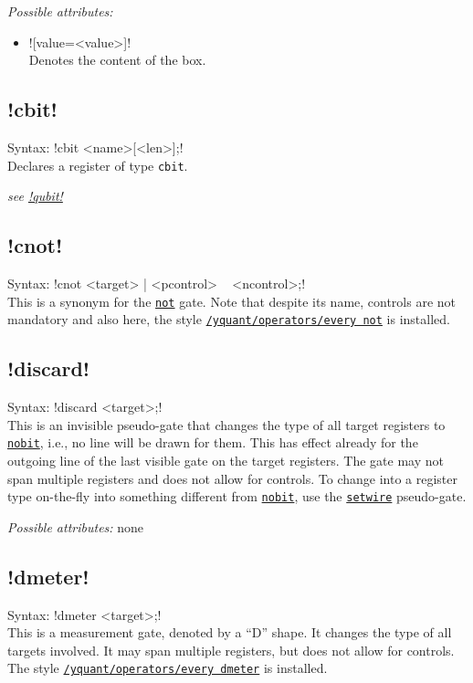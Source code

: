 \documentclass{scrartcl}
\def\gate#1{\hyperref[gate:#1]{\texttt{#1}}}
\def\style#1{\hyperref[style:#1]{\texttt{#1}}}
\begin{document}
         \emph{Possible attributes:}
         \begin{itemize}
            \item \yquant![value=<value>]! \\
               Denotes the content of the box.
         \end{itemize}
      
      \subsection{\texorpdfstring{\yquant!cbit!}{cbit}}\label{gate:cbit}
         Syntax: \yquant!cbit <name>[<len>];! \\
         Declares a register of type \texttt{cbit}.
         
         \emph{see \hyperref[gate:qubit]{\yquant!qubit!}}
      
      \subsection{\texorpdfstring{\yquant!cnot!}{cnot}}\label{gate:cnot}
         Syntax: \yquant!cnot <target> | <pcontrol> ~ <ncontrol>;! \\
         This is a synonym for the \gate{not} gate.
         Note that despite its name, controls are not mandatory and also here, the style \style{/yquant/operators/every not} is installed.
      
      \subsection{\texorpdfstring{\yquant!discard!}{discard}}\label{gate:discard}
         Syntax: \yquant!discard <target>;! \\
         This is an invisible pseudo\hyp gate that changes the type of all target registers to \gate{nobit}, i.e., no line will be drawn for them.
         This has effect already for the outgoing line of the last visible gate on the target registers.
         The gate may not span multiple registers and does not allow for controls.
         To change into a register type on\hyp the\hyp fly into something different from \gate{nobit}, use the \gate{setwire} pseudo\hyp gate.
         
         \emph{Possible attributes:} none
      
      \subsection{\texorpdfstring{\yquant!dmeter!}{dmeter}}\label{gate:dmeter}
         Syntax: \yquant!dmeter <target>;! \\
         This is a measurement gate, denoted by a ``D'' shape.
         It changes the type of all targets involved.
         It may span multiple registers, but does not allow for controls.
         The style \style{/yquant/operators/every dmeter} is installed.
         
\end{document}
